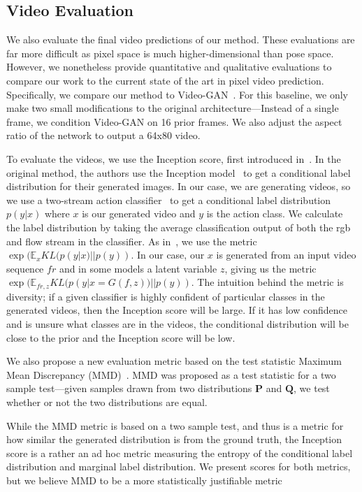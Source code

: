 \subsection{Video Evaluation}

We also evaluate the final video predictions of our method. These evaluations are far more difficult as pixel space is much higher-dimensional than pose space. However, we nonetheless provide quantitative and qualitative evaluations to compare our work to the current state of the art in pixel video prediction. Specifically, we compare our method to Video-GAN~\cite{Vondrick16}. For this baseline, we only make two small modifications to the original architecture---Instead of a single frame, we condition Video-GAN on 16 prior frames. We also adjust the aspect ratio of the network to output a 64x80 video.

 To evaluate the videos, we use the Inception score, first introduced in~\cite{Salimans16}. In the original method, the authors use the Inception model~\cite{szegedy2015going} to get a conditional label distribution for their generated images. In our case, we are generating videos, so we use a two-stream action classifier~\cite{LWang15} to get a conditional label distribution $p(y|x)$ where $x$ is our generated video and $y$ is the action class. We calculate the label distribution by taking the average classification output of both the rgb and flow stream in the classifier. As in~\cite{Salimans16}, we use the metric $\exp(\mathbb{E}_x KL(p(y|x)||p(y))$. In our case, our $x$ is generated from an input video sequence $fr$ and in some models a latent variable $z$, giving us the metric $\exp(\mathbb{E}_{fr, z} KL(p(y|x=G(f,z))||p(y))$. The intuition behind the metric is diversity; if a given classifier is highly confident of particular classes in the generated videos, then the Inception score will be large. If it has low confidence and is unsure what classes are in the videos, the conditional distribution will be close to the prior and the Inception score will be low.

We also propose a new evaluation metric based on the test statistic Maximum Mean Discrepancy (MMD)~\cite{Gretton14}. MMD was proposed as a test statistic for a two sample test---given samples drawn from two distributions $\textbf{P}$ and $\textbf{Q}$, we test whether or not the two distributions are equal.  

While the MMD metric is based on a two sample test, and thus is a metric for how similar the generated distribution is from the ground truth, the Inception score is a rather an ad hoc metric measuring the entropy of the conditional label distribution and marginal label distribution. We present scores for both metrics, but we believe MMD to be a more statistically justifiable metric

